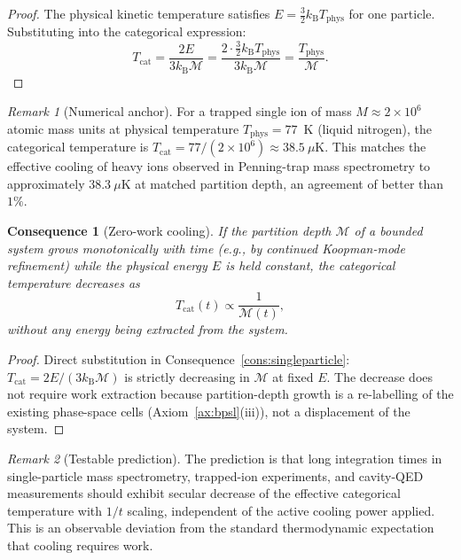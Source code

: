\documentclass[11pt,twocolumn,a4paper]{article}
\theoremstyle{axiomstyle}
\theoremstyle{conseqstyle}
\newtheorem{consequence}{Consequence}
\theoremstyle{definition}
\theoremstyle{remark}
\newtheorem*{remark}{Remark}
\newcommand{\kB}{k_{\mathrm{B}}}
\newcommand{\Depth}{\mathcal{M}}
\begin{document}
\begin{proof}
The physical kinetic temperature satisfies $E=\tfrac{3}{2}\kB T_{\mathrm{phys}}$ for one particle. Substituting into the categorical expression:
\begin{equation*}
T_{\mathrm{cat}}=\frac{2E}{3\kB\Depth}=\frac{2\cdot\tfrac{3}{2}\kB T_{\mathrm{phys}}}{3\kB\Depth}=\frac{T_{\mathrm{phys}}}{\Depth}.
\end{equation*}
\end{proof}

\begin{remark}[Numerical anchor]
For a trapped single ion of mass $M\approx 2\times 10^{6}$ atomic mass units at physical temperature $T_{\mathrm{phys}}=77$~K (liquid nitrogen), the categorical temperature is $T_{\mathrm{cat}}=77/(2\times 10^{6})\approx 38.5~\mu\mathrm{K}$. This matches the effective cooling of heavy ions observed in Penning-trap mass spectrometry to approximately $38.3~\mu\mathrm{K}$ at matched partition depth, an agreement of better than $1\%$.
\end{remark}

\begin{consequence}[Zero-work cooling]\label{cons:zerowork}
If the partition depth $\Depth$ of a bounded system grows monotonically with time (e.g., by continued Koopman-mode refinement) while the physical energy $E$ is held constant, the categorical temperature decreases as
\begin{equation}
T_{\mathrm{cat}}(t)\propto\frac{1}{\Depth(t)},
\end{equation}
without any energy being extracted from the system.
\end{consequence}

\begin{proof}
Direct substitution in Consequence~\ref{cons:singleparticle}: $T_{\mathrm{cat}}=2E/(3\kB\Depth)$ is strictly decreasing in $\Depth$ at fixed $E$. The decrease does not require work extraction because partition-depth growth is a re-labelling of the existing phase-space cells (Axiom~\ref{ax:bpsl}(iii)), not a displacement of the system.
\end{proof}

\begin{remark}[Testable prediction]
The prediction is that long integration times in single-particle mass spectrometry, trapped-ion experiments, and cavity-QED measurements should exhibit secular decrease of the effective categorical temperature with $1/t$ scaling, independent of the active cooling power applied. This is an observable deviation from the standard thermodynamic expectation that cooling requires work.
\end{remark}
\end{document}
